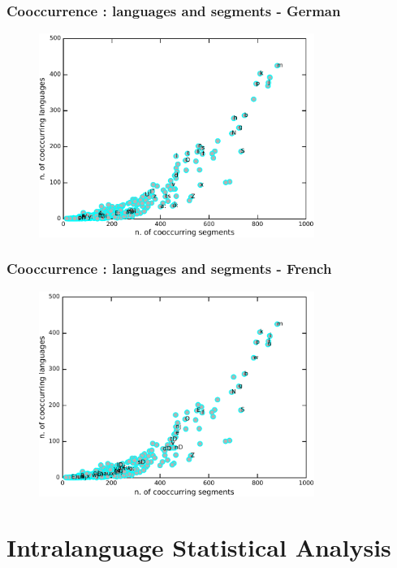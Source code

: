 \documentclass[notes]{beamer}
\begin{document}
\frame
{
  \frametitle{Cooccurrence : languages and segments - German}
  \vspace{-0.3cm}
  \begin{figure}[h!]
  \centering
  \includegraphics[width=0.8\textwidth]{images/coocc_of_speech_sounds_german.pdf}
  \label{fig:coocc_of_speech_sounds_german}
  \end{figure}
}


\frame
{
  \frametitle{Cooccurrence : languages and segments - French}
  \vspace{-0.3cm}
  \begin{figure}[h!]
  \centering
  \includegraphics[width=0.8\textwidth]{images/coocc_of_speech_sounds_french.pdf}
  \label{fig:coocc_of_speech_sounds_french}
  \end{figure}
}



\section{Intralanguage Statistical Analysis}
\end{document}
